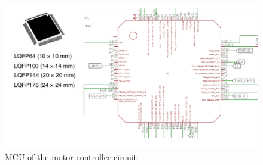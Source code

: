 \begin{figure}[H]
\centering
\includegraphics[width=1\textwidth]{./Amir_img/stmMcu.png}
\caption{MCU of the motor controller circuit}
\end{figure}

